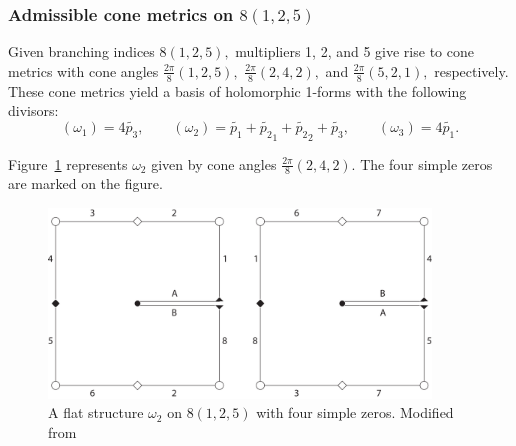 \documentclass[12pt,reqno]{amsart}
\theoremstyle{definition}
\theoremstyle{remark}
\newtheorem*{remark}{Remark}
\begin{document}
\subsubsection*{Admissible cone metrics on $8 (1, 2, 5)$} Given branching indices $8 (1, 2, 5),$ multipliers 1, 2, and 5 give rise to cone metrics with cone angles $\frac{2 \pi}{8}(1, 2, 5),$ $\frac{2 \pi}{8}(2, 4, 2),$ and $\frac{2 \pi}{8}(5, 2, 1),$ respectively. These cone metrics yield a basis of holomorphic 1-forms with the following divisors: $$(\omega_1) = 4 \widetilde{p_3}, \qquad (\omega_2) = \widetilde{p_1} + \widetilde{p_2}_1 + \widetilde{p_2}_2 + \widetilde{p_3}, \qquad (\omega_3) = 4 \widetilde{p_1}.$$

Figure~\ref{fig:flat_rs2} represents $\omega_2$ given by cone angles $\frac{2 \pi}{8}(2, 4, 2).$ The four simple zeros are marked on the figure.

\begin{figure}[htbp]
   \centering
   \includegraphics[width=4in]{figures/flat_rs2.pdf} 
  \caption{A flat structure $\omega_2$ on $8(1, 2, 5)$ with four simple zeros. Modified from \cite{dthesis}}
  \label{fig:flat_rs2}
\end{figure}



\end{document}
